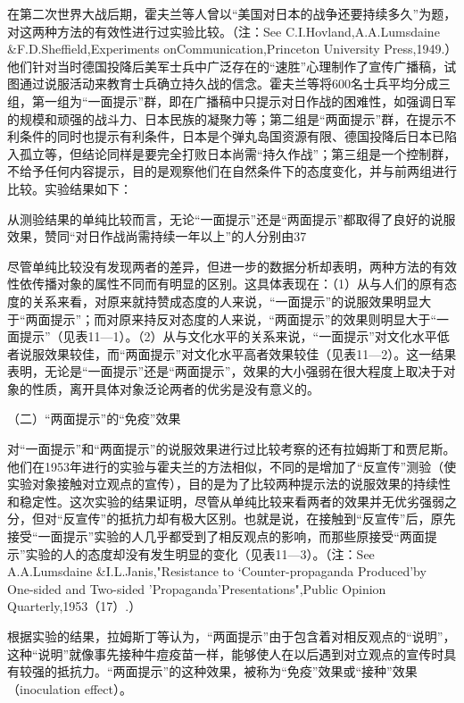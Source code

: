 \documentclass[UTF8,12pt]{ctexart}
\numberwithin{equation}{section} %
\numberwithin{figure}{section}
\numberwithin{table}{section}
\begin{document}
	在第二次世界大战后期，霍夫兰等人曾以“美国对日本的战争还要持续多久”为题，对这两种方法的有效性进行过实验比较。（注：See C.I.Hovland,A.A.Lumsdaine \&F.D.Sheffield,Experiments onCommunication,Princeton University Press,1949.）他们针对当时德国投降后美军士兵中广泛存在的“速胜”心理制作了宣传广播稿，试图通过说服活动来教育士兵确立持久战的信念。霍夫兰等将600名士兵平均分成三组，第一组为“一面提示”群，即在广播稿中只提示对日作战的困难性，如强调日军的规模和顽强的战斗力、日本民族的凝聚力等；第二组是“两面提示”群，在提示不利条件的同时也提示有利条件，日本是个弹丸岛国资源有限、德国投降后日本已陷入孤立等，但结论同样是要完全打败日本尚需“持久作战”；第三组是一个控制群，不给予任何内容提示，目的是观察他们在自然条件下的态度变化，并与前两组进行比较。实验结果如下：
	
	从测验结果的单纯比较而言，无论“一面提示”还是“两面提示”都取得了良好的说服效果，赞同“对日作战尚需持续一年以上”的人分别由37%
	
	尽管单纯比较没有发现两者的差异，但进一步的数据分析却表明，两种方法的有效性依传播对象的属性不同而有明显的区别。这具体表现在：（1）从与人们的原有态度的关系来看，对原来就持赞成态度的人来说，“一面提示”的说服效果明显大于“两面提示”；而对原来持反对态度的人来说，“两面提示”的效果则明显大于“一面提示”（见表11—1）。（2）从与文化水平的关系来说，“一面提示”对文化水平低者说服效果较佳，而“两面提示”对文化水平高者效果较佳（见表11—2）。这一结果表明，无论是“一面提示”还是“两面提示”，效果的大小强弱在很大程度上取决于对象的性质，离开具体对象泛论两者的优劣是没有意义的。
	
	（二）“两面提示”的“免疫”效果
	
	对“一面提示”和“两面提示”的说服效果进行过比较考察的还有拉姆斯丁和贾尼斯。他们在1953年进行的实验与霍夫兰的方法相似，不同的是增加了“反宣传”测验（使实验对象接触对立观点的宣传），目的是为了比较两种提示法的说服效果的持续性和稳定性。这次实验的结果证明，尽管从单纯比较来看两者的效果并无优劣强弱之分，但对“反宣传”的抵抗力却有极大区别。也就是说，在接触到“反宣传”后，原先接受“一面提示”实验的人几乎都受到了相反观点的影响，而那些原接受“两面提示”实验的人的态度却没有发生明显的变化（见表11—3）。（注：See A.A.Lumsdaine \&I.L.Janis,"Resistance to ‘Counter-propaganda Produced'by One-sided and Two-sided 'Propaganda’Presentations",Public Opinion Quarterly,1953（17）.）
	
	根据实验的结果，拉姆斯丁等认为，“两面提示”由于包含着对相反观点的“说明”，这种“说明”就像事先接种牛痘疫苗一样，能够使人在以后遇到对立观点的宣传时具有较强的抵抗力。“两面提示”的这种效果，被称为“免疫”效果或“接种”效果（inoculation effect）。
	
\end{document}
